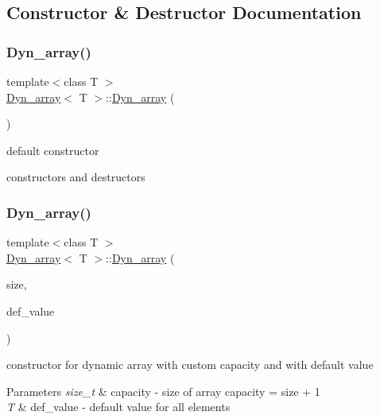\subsection{Constructor \& Destructor Documentation}
\mbox{\label{classDyn__array_a3afc99260021fc0a0861c7a6dffa7dcb}} 
\subsubsection{\texorpdfstring{Dyn\+\_\+array()}{Dyn\_array()}\hspace{0.1cm}{\footnotesize\ttfamily [1/6]}}
{\footnotesize\ttfamily template$<$class T $>$ \\
\hyperlink{classDyn__array}{Dyn\+\_\+array}$<$ T $>$\+::\hyperlink{classDyn__array}{Dyn\+\_\+array} (\begin{DoxyParamCaption}{ }\end{DoxyParamCaption})}



default constructor 

constructors and destructors \mbox{\label{classDyn__array_a3abedb7c622a7065a133741ca1e20dde}} 
\subsubsection{\texorpdfstring{Dyn\+\_\+array()}{Dyn\_array()}\hspace{0.1cm}{\footnotesize\ttfamily [2/6]}}
{\footnotesize\ttfamily template$<$class T $>$ \\
\hyperlink{classDyn__array}{Dyn\+\_\+array}$<$ T $>$\+::\hyperlink{classDyn__array}{Dyn\+\_\+array} (\begin{DoxyParamCaption}\item[{const size\+\_\+t}]{size,  }\item[{const T}]{def\+\_\+value }\end{DoxyParamCaption})}



constructor for dynamic array with custom capacity and with default value 


\begin{DoxyParams}{Parameters}
{\em size\+\_\+t} & capacity -\/ size of array capacity = size + 1 \\
\hline
{\em T} & def\+\_\+value -\/ default value for all elements \\
\hline
\end{DoxyParams}
\mbox{\label{classDyn__array_ab65231e8b87c5fbb58f22fb8a1d18ee3}} 
